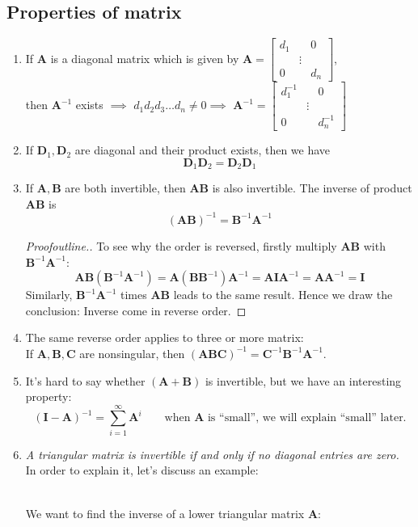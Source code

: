 \subsection{Properties of matrix}
\begin{enumerate}
\item
If $\bm A$ is a diagonal matrix which is given by
$
\bm A = \begin{bmatrix}
d_1&&0\\
&\vdots&\\
0&&d_n
\end{bmatrix}$,\\ then $\bm A^{-1}$ exists $\implies$ $d_1d_2d_3\dots d_n \ne 0$$\implies$
$
\bm A^{-1} = \begin{bmatrix}
d_1^{-1}&&0\\
&\vdots&\\
0&&d_n^{-1}
\end{bmatrix}
$
\item
If $\bm D_1,\bm D_2$ are diagonal and their product exists, then we have
\[
\bm D_1\bm D_2 = \bm D_2\bm D_1
\]
\item
If $\bm A,\bm B$ are both invertible, then $\bm{AB}$ is also invertible. The inverse of product $\bm{AB}$ is 
\[
(\bm{AB})^{-1} = \bm B^{-1}\bm A^{-1}
\]
\begin{proof}[Proofoutline.]
To see why the order is reversed, firstly multiply $\bm{AB}$ with $\bm B^{-1}\bm A^{-1}$:
\[
\bm{AB}(\bm B^{-1}\bm A^{-1}) = \bm{A}(\bm B\bm B^{-1})\bm A^{-1} = \bm A \bm I\bm A^{-1} = \bm A\bm A^{-1} = \bm I
\]
Similarly, $\bm B^{-1}\bm A^{-1}$ times $\bm{AB}$ leads to the same result. Hence we draw the conclusion: Inverse come in reverse order.
\end{proof}
\item
The same reverse order applies to three or more matrix:\\
If $\bm A,\bm B,\bm C$ are nonsingular, then $(\bm{ABC})^{-1} = \bm C^{-1}\bm B^{-1}\bm A^{-1}$.
\item
It's hard to say whether $(\bm A+\bm B)$ is invertible, but we have an interesting property:
\[
(\bm I-\bm A)^{-1} = \sum_{i=1}^{\infty}\bm A^{i}\qquad\text{when $\bm A$ is ``small'', we will explain ``small'' later.}
\]
\item
\emph{A triangular matrix is invertible if and only if no diagonal entries are zero.}\\
In order to explain it, let's discuss an example:
\begin{example}\qquad\\
We want to find the inverse of a lower triangular matrix $\bm A$:

\end{example}$$
\end{enumerate}
